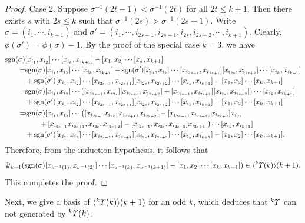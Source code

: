 \documentclass{amsart}
\theoremstyle{definition}
\theoremstyle{remark}
\numberwithin{equation}{section}
\def\sgn{{\rm sgn}}
\newcommand{\lr}[1]{\langle #1 \rangle}
\newcommand{\up}[1]{{^{#1}{\it \!\Upsilon}}}
\begin{document}
\begin{proof}
Case 2. Suppose $\sigma^{-1}(2t-1)<\sigma^{-1}(2t)$
for all $2t\leq k+1$. Then there exists $s$ with 
$2s\le k$ such that $\sigma^{-1}(2s)>\sigma^{-1}(2s+1)$.
Write $\sigma=(i_1, \cdots, i_{k+1})$ and 
$\sigma'=(i_1, \cdots, i_{2s-1}, i_{2s+1}, 
i_{2s}, i_{2s+2}, \cdots, i_{k+1})$. 
Clearly, $\phi(\sigma')=\phi(\sigma)-1$.  
By the proof of the special case $k=3$, we have 
\begin{align*}
\sgn(\sigma)&[x_{i_1}, x_{i_2}]\cdots 
[x_{i_k}, x_{i_{k+1}}]-[x_1, x_2]\cdots[x_{k}, x_{k+1}]\\
=&\sgn(\sigma)[x_{i_1}, x_{i_2}]\cdots 
[x_{i_k}, x_{i_{k+1}}]-\sgn(\sigma')[x_{i_1}, x_{i_2}]
\cdots[x_{i_{2s-1}}, x_{i_{2s+1}}][x_{i_{2s}}, x_{i_{2s+2}}]
\cdots [x_{i_k}, x_{i_{k+1}}]\\
&+\sgn(\sigma')[x_{i_1}, x_{i_2}]
\cdots[x_{i_{2s-1}}, x_{i_{2s+1}}][x_{i_{2s}}, x_{i_{2s+2}}]
\cdots [x_{i_k}, x_{i_{k+1}}]-
[x_1, x_2]\cdots[x_{k}, x_{k+1}]\\
=&\sgn(\sigma)[x_{i_1}, x_{i_2}]\cdots 
([x_{i_{2s-1}}, x_{i_{2s}}][x_{i_{2s+1}}, x_{i_{2s+2}}]
+[x_{i_{2s-1}}, x_{i_{2s+1}}][x_{i_{2s}}, x_{i_{2s+2}}])
\cdots [x_{i_k}, x_{i_{k+1}}]\\
&+\sgn(\sigma')[x_{i_1}, x_{i_2}]
\cdots[x_{i_{2s-1}}, x_{i_{2s+1}}][x_{i_{2s}}, x_{i_{2s+2}}]
\cdots [x_{i_k}, x_{i_{k+1}}]-
[x_1, x_2]\cdots[x_{k}, x_{k+1}]\\
=& \sgn(\sigma)[x_{i_1}, x_{i_2}]
\cdots \left([x_{i_{2s-1}}x_{i_{2s}}, x_{i_{2s+1}}, x_{i_{2s+2}}]
-[x_{i_{2s-1}}, x_{i_{2s+1}},x_{i_{2s+2}}]x_{i_{2s}}\right.\\
&\qquad+[x_{i_{2s-1}}x_{i_{2s+1}}, x_{i_{2s}}, x_{i_{2s+2}}]
-[x_{i_{2s-1}}, x_{i_{2s}},x_{i_{2s+2}}]x_{i_{2s+1}}\left. \right)
\cdots[x_{i_k}, x_{i_{k+1}}]\\
&+\sgn(\sigma')[x_{i_1}, x_{i_2}]\cdots[x_{i_{2s-1}}, x_{i_{2s+1}}]
[x_{i_{2s}}, x_{i_{2s+2}}]\cdots [x_{i_k}, x_{i_{k+1}}]-
[x_1, x_2]\cdots[x_{k}, x_{k+1}].
\end{align*}
Therefore, from the induction hypothesis, it follows that 
\[\Psi_{k+1}(\sgn(\sigma)[x_{\sigma^{-1}(1)}, x_{\sigma^{-1}(2)}]
\cdots [x_{\sigma^{-1}(k)}, x_{\sigma^{-1}(k+1)}]-[x_1, x_2]
\cdots[x_{k}, x_{k+1}])\in \lr{\up{k}(k)}(k+1).\]
This completes the proof.
\end{proof}

Next, we give a basis of $\lr{\up{k}(k)}(k+1)$ for an 
odd $k$, which deduces that $\up{k}$ can not generated 
by $\up{k}(k)$. 
\end{document}
